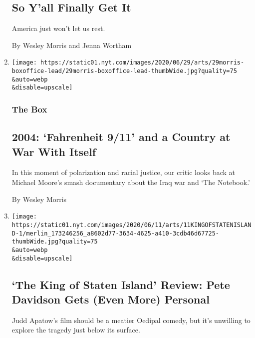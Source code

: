 \begin{enumerate}
  \hypertarget{so-yall-finally-get-it}{%
  \subsection{So Y'all Finally Get It}\label{so-yall-finally-get-it}}

  America just won't let us rest.

  By Wesley Morris and Jenna Wortham
\item
  \href{/2020/06/30/movies/fahrenheit-911-movie-2004.html}{}

  \texttt{[image: https://static01.nyt.com/images/2020/06/29/arts/29morris-boxoffice-lead/29morris-boxoffice-lead-thumbWide.jpg?quality=75\\\&auto=webp\\\&disable=upscale]}

  \hypertarget{the-box}{%
  \subsubsection{The Box}\label{the-box}}

  \hypertarget{2004-fahrenheit-911-and-a-country-at-war-with-itself}{%
  \subsection{2004: `Fahrenheit 9/11' and a Country at War With
  Itself}\label{2004-fahrenheit-911-and-a-country-at-war-with-itself}}

  In this moment of polarization and racial justice, our critic looks
  back at Michael Moore's smash documentary about the Iraq war and `The
  Notebook.'

  By Wesley Morris
\item
  \href{/2020/06/11/movies/the-king-of-staten-island-review.html}{}

  \texttt{[image: https://static01.nyt.com/images/2020/06/11/arts/11KINGOFSTATENISLAND-1/merlin\_173246256\_a8602d77-3634-4625-a410-3cdb46d67725-thumbWide.jpg?quality=75\\\&auto=webp\\\&disable=upscale]}

  \hypertarget{the-king-of-staten-island-review-pete-davidson-gets-even-more-personal}{%
  \subsection{`The King of Staten Island' Review: Pete Davidson Gets
  (Even More)
  Personal}\label{the-king-of-staten-island-review-pete-davidson-gets-even-more-personal}}

  Judd Apatow's film should be a meatier Oedipal comedy, but it's
  unwilling to explore the tragedy just below its surface.


\end{enumerate}
